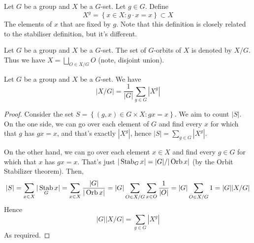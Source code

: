 \begin{definition}
  Let $G$ be a group and $X$ be a $G$-set. Let $g\in G$. Define
  \[X^g=\left\{ x\in X : g\cdot x =x \right\} \subset X\]
  The elements of $x$ that are fixed by $g$. Note that this definition is closely related
  to the stabiliser definition, but it's different.
\end{definition}

\begin{definition}
  Let $G$ be a group and $X$ be a $G$-set. The set of $G$-orbits of $X$ is denoted by
  $X/G$. Thus we have $X=\bigsqcup_{O\in X/G} O$ (note, disjoint union).
\end{definition}

\begin{theorem}
  Let $G$ be a group and $X$ be a $G$-set. We have 
  \[|X/G|=\frac{1}{|G|}\sum_{g\in G} |X^g|\]
  \label{thm:notBurnside}
\end{theorem}
\begin{proof}
  Consider the set $S=\left\{ (g,x)\in G\times X : gx=x \right\}$. We aim to count $|S|$.
  On the one side, we can go over each element of $G$ and find every $x$ for which that
  $g$ has $gx=x$, and that's exactly $|X^g|$, hence $|S|=\sum_{g\in G} |X^g|$.

  On the other hand, we can go over each element $x\in X$ and find every $g\in G$ for which
  that $x$ has $gx=x$. That's just $|\operatorname*{Stab}_G x|= |G|/|\operatorname*{Orb} x|$ (by the Orbit Stabilizer
  theorem). Then, 
  \[|S|= \sum_{x\in X} |\operatorname*{Stab}_G x|= \sum_{x\in X} \frac{|G|}{|\operatorname*{Orb} x|}= |G|
  \sum_{O\in X/G} \sum_{x\in O} \frac{1}{|O|}= |G|\sum_{O\in X/G} 1 = |G||X/G|\]
  Hence
  \[|G||X/G| = \sum_{g\in G} |X^g|\]
  As required.
\end{proof}

